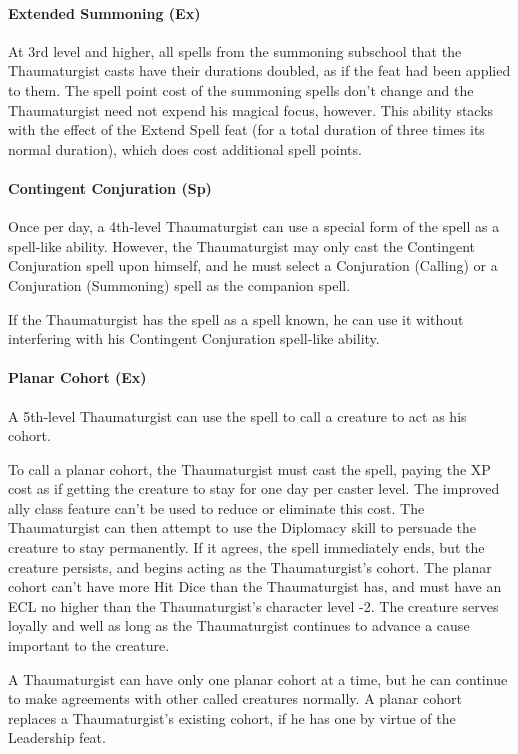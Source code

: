 \paragraph{Extended Summoning (Ex)}
At 3rd level and higher, all spells from the summoning subschool that the Thaumaturgist casts have their durations doubled, as if the  feat had been applied to them. 
The spell point cost of the summoning spells don't change and the Thaumaturgist need not expend his magical focus, however. 
This ability stacks with the effect of the Extend Spell feat (for a total duration of three times its normal duration), which does cost additional spell points.

\paragraph{Contingent Conjuration (Sp)}
Once per day, a 4th-level Thaumaturgist can use a special form of the  spell as a spell-like ability. However, the Thaumaturgist may only cast the Contingent Conjuration spell upon himself, and he must select a Conjuration (Calling) or a Conjuration (Summoning) spell as the companion spell.

If the Thaumaturgist has the  spell as a spell known, he can use it without interfering with his Contingent Conjuration spell-like ability.
\paragraph{Planar Cohort (Ex)}
A 5th-level Thaumaturgist can use the  spell to call a creature to act as his cohort. 

To call a planar cohort, the Thaumaturgist must cast the spell, paying the XP cost as if getting the creature to stay for one day per caster level. The improved ally class feature can't be used to reduce or eliminate this cost. 
The Thaumaturgist can then attempt to use the Diplomacy skill to persuade the creature to stay permanently. 
If it agrees, the  spell immediately ends, but the creature persists, and begins acting as the Thaumaturgist's cohort.
The planar cohort can't have more Hit Dice than the Thaumaturgist has, and must have an ECL no higher than the Thaumaturgist's character level -2.
The creature serves loyally and well as long as the Thaumaturgist continues to advance a cause important to the creature.

A Thaumaturgist can have only one planar cohort at a time, but he can continue to make agreements with other called creatures normally. 
A planar cohort replaces a Thaumaturgist's existing cohort, if he has one by virtue of the Leadership feat.